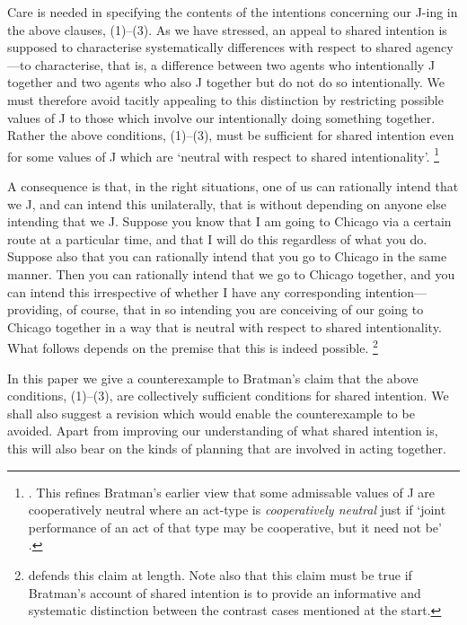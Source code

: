 \documentclass[12pt,\papersize]{extarticle}
\begin{document}
Care is needed in specifying the contents of the intentions concerning our J-ing in the above clauses, (1)--(3). 
As we have stressed, 
an appeal to shared intention is supposed to characterise systematically differences with respect to shared agency---to characterise, that is, a difference between two agents who intentionally J together and two agents who also  J together but do not do so intentionally.
We must therefore avoid tacitly appealing to this distinction by  restricting possible values of J to those which involve our intentionally doing something together. 
Rather the above  conditions, (1)--(3), must be sufficient for shared intention even for some values of J which are `neutral with respect to shared intentionality'.%
\footnote{
 \citet[p.\ 147]{Bratman:1999fr}.
 This refines Bratman's earlier view that some admissable values of J are cooperatively neutral 
 	where an  act-type is \emph{cooperatively neutral} just if `joint performance of an act of that type may be cooperative, but it need not be' \citep[p.\ 330]{Bratman:1992mi}. 
}

A consequence is that, in the right situations, one of us can rationally intend that we J, and can intend this unilaterally, that is without depending on anyone else intending that we J. 
Suppose you know that I am going to Chicago via a certain route at a particular time, 
and that I will do this regardless of what you do.
Suppose also that you can rationally intend that you go to Chicago in the same manner.
Then you can rationally intend that we go to Chicago together, 
	and you can intend this irrespective of whether I have any corresponding intention---providing, of course, that in so intending you are conceiving of our going to Chicago together in a way that is neutral with respect to shared intentionality.
What follows depends on the premise that this is indeed possible.%
\footnote{ 
\citet{Bratman:1999fr}  defends this claim at length. 
Note also that this claim must be true if Bratman's account of shared intention is to provide an informative and systematic distinction between the contrast cases mentioned at the start.
}


In this paper we give a counterexample to Bratman's  claim that the above conditions, (1)--(3), are collectively sufficient conditions for shared intention. 
We shall also suggest a revision which would enable the counterexample to be avoided.
Apart from improving our understanding of what shared intention is, 
this will also bear on the kinds of planning that are involved in acting together.
\end{document}

